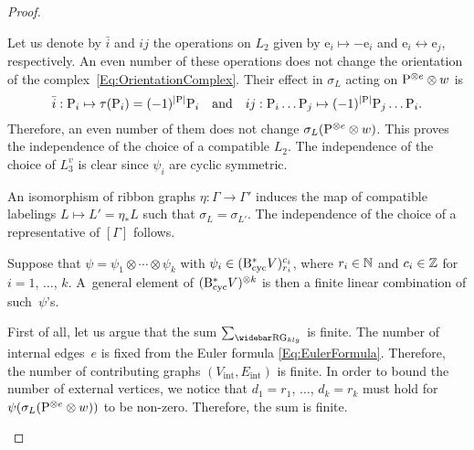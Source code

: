 \documentclass[\MainFolder/Text.tex]{subfiles}
\begin{document}
\begin{proof}
\begin{ProofList}
\item Let us denote by $\bar{i}$ and $ij$ the operations on $L_2$ given by $\mathrm{e}_i \mapsto -\mathrm{e}_i$ and $\mathrm{e}_i \leftrightarrow \mathrm{e}_j$, respectively. An even number of these operations does not change the orientation of the complex~\eqref{Eq:OrientationComplex}. Their effect in $\sigma_L$ acting on $\mathrm{P}^{\otimes e}\otimes w$ is
\begin{equation*}
\bar{i}: \mathrm{P}_i\mapsto \tau(\mathrm{P}_i) = (-1)^{|\mathrm{P}|} \mathrm{P}_i\quad\text{and}\quad ij: \mathrm{P}_i \dots \mathrm{P}_j\mapsto (-1)^{|\mathrm{P}|} \mathrm{P}_j \dots \mathrm{P}_i.
\end{equation*}
Therefore, an even number of them does not change $\sigma_L(\mathrm{P}^{\otimes e}\otimes w)$. This proves the independence of the choice of a compatible $L_2$. The independence of the choice of $L_{3}^v$ is clear since $\psi_i$ are cyclic symmetric.

An isomorphism of ribbon graphs $\eta: \Gamma \rightarrow \Gamma'$ induces the map of compatible labelings $L \mapsto L' = \eta_* L$ such that $\sigma_{L} = \sigma_{L'}$. The independence of the choice of a representative of $[\Gamma]$ follows.

\item Suppose that $\psi = \psi_1 \otimes \dotsb \otimes \psi_k$ with $\psi_i \in (\mathrm{B}_{\mathrm{cyc}}^* V)_{r_i}^{c_i}$, where $r_i\in \mathbb{N}$ and $c_i \in \mathbb{Z}$ for $i=1$, $\dotsc$, $k$. A~general element of $(\mathrm{B}_{\mathrm{cyc}}^* V)^{\otimes k}$ is then a finite linear combination of such~$\psi$'s. 

First of all, let us argue that the sum $\sum_{\RRG_{klg}}$ is finite. The number of internal edges~$e$ is fixed from the Euler formula \eqref{Eq:EulerFormula}. Therefore, the number of contributing graphs $(V_{\mathrm{int}}, E_{\mathrm{int}})$ is finite. In order to bound the number of external vertices, we notice that $d_1 = r_1$, $\dotsc$, $d_k = r_k$ must hold for $\psi(\sigma_L(\mathrm{P}^{\otimes e}\otimes w))$ to be non-zero. Therefore, the sum is finite.


\end{ProofList}
\end{proof}
\end{document}
